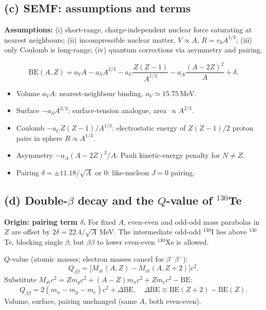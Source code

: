 \documentclass[11pt]{article}
\begin{document}
\subsection*{(c) SEMF: assumptions and terms}

\textbf{Assumptions:} (i) short-range, charge-independent nuclear force saturating at nearest neighbours; (ii) incompressible nuclear matter, $V\propto A$, $R=r_0 A^{1/3}$; (iii) only Coulomb is long-range; (iv) quantum corrections via asymmetry and pairing.

\[
\mathrm{BE}(A,Z)=a_V A-a_S A^{2/3}-a_C\frac{Z(Z-1)}{A^{1/3}}-a_A\frac{(A-2Z)^2}{A}+\delta.
\]
\begin{itemize}
\item Volume $a_V A$: nearest-neighbour binding, $a_V\simeq 15.75$\,MeV.
\item Surface $-a_S A^{2/3}$: surface-tension analogue, area $\propto A^{2/3}$.
\item Coulomb $-a_C Z(Z-1)/A^{1/3}$: electrostatic energy of $Z(Z-1)/2$ proton pairs in sphere $R\propto A^{1/3}$.
\item Asymmetry $-a_A(A-2Z)^2/A$: Pauli kinetic-energy penalty for $N\ne Z$.
\item Pairing $\delta=\pm 11.18/\sqrt A$ or $0$: like-nucleon $J=0$ pairing.
\end{itemize}

\subsection*{(d) Double-$\beta$ decay and the $Q$-value of $^{130}$Te}

\textbf{Origin: pairing term $\delta$.} For fixed $A$, even-even and odd-odd mass parabolas in $Z$ are offset by $2\delta=22.4/\sqrt A$\,MeV. The intermediate odd-odd $^{130}$I lies above $^{130}$Te, blocking single $\beta$; but $\beta\beta$ to lower even-even $^{130}$Xe is allowed.

$Q$-value (atomic masses; electron masses cancel for $\beta^-\beta^-$):
\[
Q_{\beta\beta}=\bigl[M_\mathrm{at}(A,Z)-M_\mathrm{at}(A,Z+2)\bigr]c^2.
\]
Substitute $M_\mathrm{at}c^2=Z m_p c^2+(A-Z) m_n c^2+Z m_e c^2-\mathrm{BE}$:
\[
Q_{\beta\beta}=2(m_n-m_p-m_e)c^2+\Delta\mathrm{BE},\quad \Delta\mathrm{BE}\equiv \mathrm{BE}(Z+2)-\mathrm{BE}(Z).
\]
Volume, surface, pairing unchanged (same $A$, both even-even).
\end{document}
